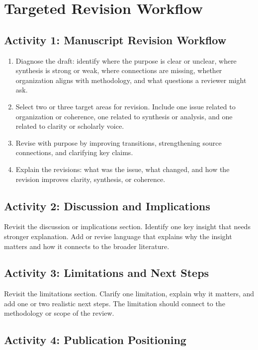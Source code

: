 \documentclass[11pt]{article}
\begin{document}
\section{Targeted Revision Workflow}

\subsection{Activity 1: Manuscript Revision Workflow}

\begin{enumerate}
  \item Diagnose the draft: identify where the purpose is clear or unclear, where synthesis is strong or weak, where connections are missing, whether organization aligns with methodology, and what questions a reviewer might ask.
  \item Select two or three target areas for revision. Include one issue related to organization or coherence, one related to synthesis or analysis, and one related to clarity or scholarly voice.
  \item Revise with purpose by improving transitions, strengthening source connections, and clarifying key claims.
  \item Explain the revisions: what was the issue, what changed, and how the revision improves clarity, synthesis, or coherence.
\end{enumerate}

\subsection{Activity 2: Discussion and Implications}

Revisit the discussion or implications section. Identify one key insight that needs stronger explanation. Add or revise language that explains why the insight matters and how it connects to the broader literature.

\subsection{Activity 3: Limitations and Next Steps}

Revisit the limitations section. Clarify one limitation, explain why it matters, and add one or two realistic next steps. The limitation should connect to the methodology or scope of the review.

\subsection{Activity 4: Publication Positioning}
\end{document}

